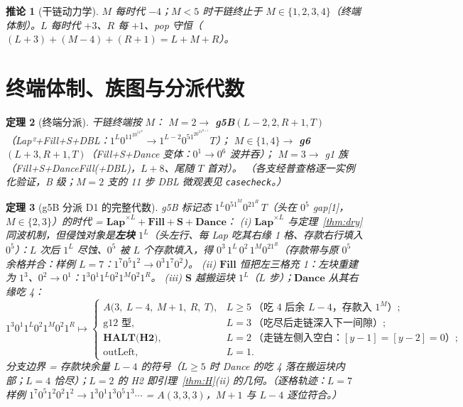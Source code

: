 \documentclass[11pt]{ctexart}
\newtheorem{theorem}{定理}[section]
\newtheorem{corollary}[theorem]{推论}
\theoremstyle{definition}
\begin{document}
\begin{corollary}[干链动力学]\label{cor:chain}
$M$ 每时代 $-4$；$M<5$ 时干链终止于 $M\in\{1,2,3,4\}$（终端体制）。$L$ 每时代 $+3$、$R$ 每 $+1$、pop 守恒（$(L{+}3){+}(M{-}4){+}(R{+}1)=L{+}M{+}R$）。
\end{corollary}

\section{终端体制、族图与分派代数}

\begin{theorem}[终端分派]\label{thm:terminal}
干链终端按 $M$：
$M{=}2\to$ \textbf{g5B}$(L{-}2,2,R{+}1,T)$（Lap²+Fill+S+DBL：$1^L0^11^20^51^R\to1^{L-2}0^51^20^21^{R+1}T$）；
$M\in\{1,4\}\to$ \textbf{g6}$(L{+}3,R{+}1,T)$（Fill+S+Dance 变体：$0^1\to0^6$ 波并吞）；
$M{=}3\to$ g1 族（Fill+S+DanceFill(+DBL)，$L{+}8$、尾随 $T$ 首对）。
（各支经普查格逐一实例化验证，B 级；$M{=}2$ 支的 11 步 DBL 微观表见 \texttt{casecheck}。）
\end{theorem}

\begin{theorem}[g5B 分派 D1 的完整代数]\label{thm:D1}
g5B 标记态 $1^L0^51^M0^21^R\,T$（头在 $0^5$ gap[1]，$M\in\{2,3\}$）的时代 = $\mathbf{Lap}^{\times L}+\mathbf{Fill}+\mathbf{S}+\mathbf{Dance}$：
\emph{(i)} $\mathbf{Lap}^{\times L}$ 与定理~\ref{thm:dry} 同波机制，但侵蚀对象是\textbf{左块} $1^L$（头左行、每 Lap 吃其右缘 1 格、存款右行填入 $0^5$）：$L$ 次后 $1^L$ 尽蚀、$0^5$ 被 $L$ 个存款填入，得 $0^3\,1^L\,0^2\,1^M0^21^R$（存款带与原 $0^5$ 余格并合：样例 $L{=}7$：$1^7 0^5 1^2\to0^3 1^7 0^2$）。
\emph{(ii)} $\mathbf{Fill}$ 恒把左三格充 1：左块重建为 $1^3$、$0^2\to0^1$：$1^3 0^1 1^L 0^2 1^M 0^2 1^R$。
\emph{(iii)} $\mathbf{S}$ 越搬运块 $1^L$（$L$ 步）；$\mathbf{Dance}$ 从其右缘吃 4：
\[
1^3 0^1 1^{L} 0^2 1^M 0^2 1^R \longmapsto
\begin{cases}
A\bigl(3,\ L{-}4,\ M{+}1,\ R,\ T\bigr), & L\ge5\ \text{（吃 4 后余 }L{-}4\text{，存款入 }1^M\text{）};\\
\text{g12 型}, & L=3\ \text{（吃尽后走链深入下一间隙）};\\
\textbf{HALT(H2)}, & L=2\ \text{（走链左侧入空白：} [y{-}1]{=}[y{-}2]{=}0\text{）};\\
\text{outLeft}, & L=1 .
\end{cases}
\]
分支边界 = 存款块余量 $L-4$ 的符号（$L\ge5$ 时 Dance 的吃 4 落在搬运块内部；$L{=}4$ 恰尽）；$L{=}2$ 的 H2 即引理~\ref{thm:H}(ii) 的几何。（逐格轨迹：$L{=}7$ 样例 $1^7 0^5 1^2 0^2 1^2\to1^3 0^1 1^3 0^5 1^3\cdots$ = $A(3,3,3)$，$M{+}1$ 与 $L{-}4$ 逐位符合。）
\end{theorem}
\end{document}
